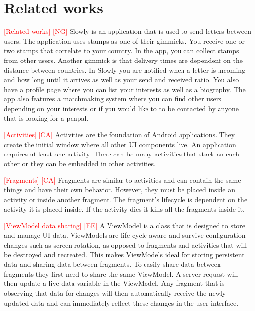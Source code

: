 \documentclass[acmlarge, review=false, screen=true]{acmart}
\begin{document}
  \section{Related works}
    \textcolor{red}{[Related works] [NG]} \newline
    Slowly is an application that is used to send letters between users\cite{slowly}. The application uses stamps as one of their gimmicks. You receive one or two stamps that correlate to your country. In the app, you can collect stamps from other users. Another gimmick is that delivery times are dependent on the distance between countries. In Slowly you are notified when a letter is incoming and how long until it arrives as well as your send and received ratio. You also have a profile page where you can list your interests as well as a biography. The app also features a matchmaking system where you can find other users depending on your interests or if you would like to to be contacted by anyone that is looking for a penpal.

    \textcolor{red}{[Activities] [CA]} \newline
    Activities are the foundation of Android applications\cite{activity}. They create the initial window where all other UI components live. An application requires at least one activity. There can be many activities that stack on each other or they can be embedded in other activities. 

    \textcolor{red}{[Fragments] [CA]} \newline
    Fragments are similar to activities and can contain the same things and have their own behavior\cite{fragments}. However, they must be placed inside an activity or inside another fragment. The fragment’s lifecycle is dependent on the activity it is placed inside. If the activity dies it kills all the fragments inside it.

    \textcolor{red}{[ViewModel data sharing] [EE]} \newline
    A ViewModel is a class that is designed to store and manage UI data\cite{viewmodel}. ViewModels are life-cycle aware and survive configuration changes such as screen rotation, as opposed to fragments and activities that will be destroyed and recreated. This makes ViewModels ideal for storing persistent data and sharing data between fragments. To easily share data between fragments they first need to share the same ViewModel. A server request will then update a live data variable in the ViewModel. Any fragment that is observing that data for changes will then automatically receive the newly updated data and can immediately reflect these changes in the user interface. 
\end{document}
